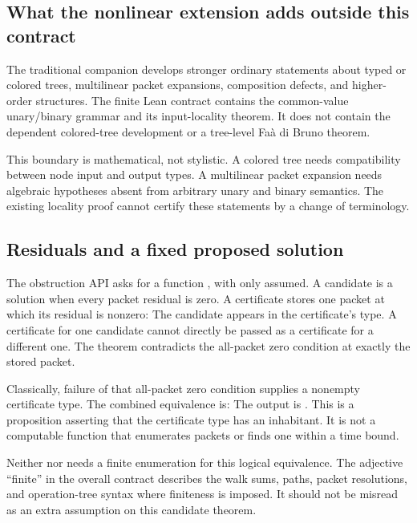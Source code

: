 \subsection{What the nonlinear extension adds outside this contract}
The traditional companion develops stronger ordinary statements about typed or colored trees, multilinear packet expansions, composition defects, and higher-order structures. The finite Lean contract contains the common-value unary/binary grammar and its input-locality theorem. It does not contain the dependent colored-tree development or a tree-level Faà di Bruno theorem.

This boundary is mathematical, not stylistic. A colored tree needs compatibility between node input and output types. A multilinear packet expansion needs algebraic hypotheses absent from arbitrary unary and binary semantics. The existing locality proof cannot certify these statements by a change of terminology.

\subsection{Residuals and a fixed proposed solution}
The obstruction API asks for a function
, with only  assumed. A candidate is a solution when every packet residual is zero. A certificate stores one packet at which its residual is nonzero:
The candidate appears in the certificate's type. A certificate for one candidate cannot directly be passed as a certificate for a different one. The theorem  contradicts the all-packet zero condition at exactly the stored packet.

Classically, failure of that all-packet zero condition supplies a nonempty certificate type. The combined equivalence is:
The output is . This is a proposition asserting that the certificate type has an inhabitant. It is not a computable function that enumerates packets or finds one within a time bound.

Neither  nor  needs a finite enumeration for this logical equivalence. The adjective ``finite'' in the overall contract describes the walk sums, paths, packet resolutions, and operation-tree syntax where finiteness is imposed. It should not be misread as an extra  assumption on this candidate theorem.


